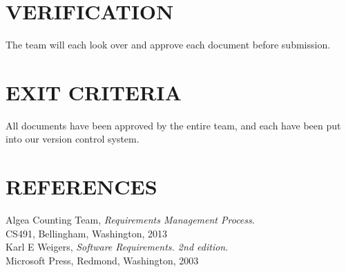 \documentclass[11pt]{article}
\begin{document}
\section{VERIFICATION}
The team will each look over and approve each document before submission.\\

\section{EXIT CRITERIA} 
All documents have been approved by the entire team, and each have been put into our version control system.\\

\section{REFERENCES} 

	Algea Counting Team,
	\emph{Requirements Management Process}. \\
	CS491, Bellingham, Washington, 2013\\

  Karl E Weigers,
  \emph{Software Requirements. 2nd edition}. \\
  Microsoft Press, Redmond, Washington, 2003
\end{document}
